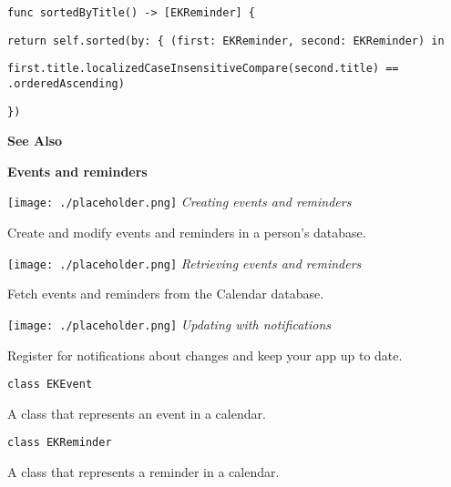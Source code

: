 \documentclass{article}
\begin{document}
\noindent
\texttt{func sortedByTitle() -> [EKReminder] \{}

\noindent
\texttt{return self.sorted(by: \{ (first: EKReminder, second: EKReminder) in}

\noindent
\texttt{first.title.localizedCaseInsensitiveCompare(second.title) == .orderedAscending)}

\noindent
\texttt{\})}

\noindent
\textbf{See Also}

\noindent
\textbf{Events and reminders}

\noindent
\texttt{[image: ./placeholder.png]} \textit{Creating events and reminders}

\noindent
Create and modify events and reminders in a person's database.

\noindent
\texttt{[image: ./placeholder.png]} \textit{Retrieving events and reminders}

\noindent
Fetch events and reminders from the Calendar database.

\noindent
\texttt{[image: ./placeholder.png]} \textit{Updating with notifications}

\noindent
Register for notifications about changes and keep your app up to date.

\noindent
\texttt{class EKEvent}

\noindent
A class that represents an event in a calendar.

\noindent
\texttt{class EKReminder}

\noindent
A class that represents a reminder in a calendar.
\newpage
\end{document}
